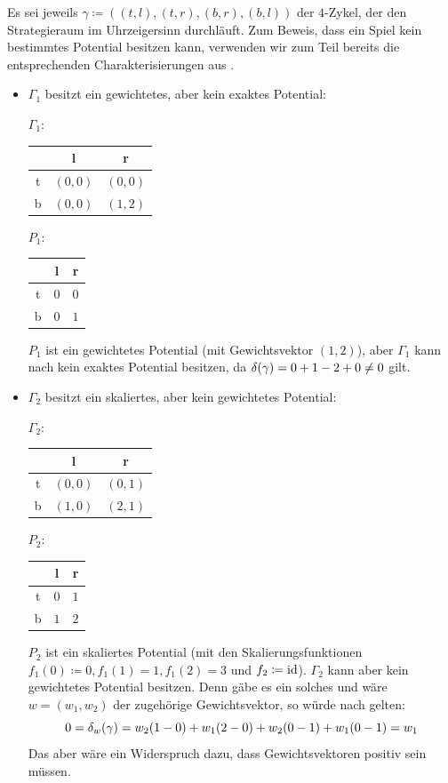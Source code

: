 \begin{bsp}\label{bsp:PotentialInklusionen}
	Es sei jeweils $\gamma \coloneqq ((t,l), (t,r), (b,r), (b,l))$ der $4$-Zykel, der den Strategieraum im Uhrzeigersinn durchläuft. Zum Beweis, dass ein Spiel kein bestimmtes Potential besitzen kann, verwenden wir zum Teil bereits die entsprechenden Charakterisierungen aus .
	\begin{itemize}
		\item $\Gamma_1$ besitzt ein gewichtetes, aber kein exaktes Potential:
			\begin{center}
				$\Gamma_1:$ \quad
				\begin{tabular}{c||c|c}
					& l 		& r 		\\\hline\hline
					t	& $(0,0)$	& $(0,0)$	\\\hline
					b	& $(0,0)$	& $(1,2)$ 
				\end{tabular}\hspace{5em}
				$P_1:$ \quad
				\begin{tabular}{c||c|c}
					& l 		& r 		\\\hline\hline
					t	& $0$	& $0$	\\\hline
					b	& $0$	& $1$ 
				\end{tabular}
			\end{center}
			$P_1$ ist ein gewichtetes Potential (mit Gewichtsvektor $(1,2)$), aber $\Gamma_1$ kann nach  kein exaktes Potential besitzen, da $\delta(\gamma) = 0 + 1 - 2 + 0 \neq 0$ gilt.
		
		\item $\Gamma_2$ besitzt ein skaliertes, aber kein gewichtetes Potential:
			\begin{center}
				$\Gamma_2:$ \quad
				\begin{tabular}{c||c|c}
					& l 		& r 		\\\hline\hline
					t	& $(0,0)$	& $(0,1)$	\\\hline
					b	& $(1,0)$	& $(2,1)$ 
				\end{tabular}\hspace{5em}
				$P_2:$ \quad
				\begin{tabular}{c||c|c}
					& l 		& r 		\\\hline\hline
					t	& $0$	& $1$	\\\hline
					b	& $1$	& $2$ 
				\end{tabular}
			\end{center}
			$P_2$ ist ein skaliertes Potential (mit den Skalierungsfunktionen $f_1(0) \coloneqq 0, f_1(1) = 1, f_1(2) = 3$ und $f_2 \coloneqq \mathrm{id}$). $\Gamma_2$ kann aber kein gewichtetes Potential besitzen. Denn gäbe es ein solches und wäre $w = (w_1, w_2)$ der zugehörige Gewichtsvektor, so würde nach  gelten:
				\[0 = \delta_w(\gamma) = w_2(1-0) + w_1(2-0) + w_2(0-1) + w_1(0-1) = w_1 \]
			Das aber wäre ein Widerspruch dazu, dass Gewichtsvektoren positiv sein müssen.
			

\end{itemize}
\end{bsp}
